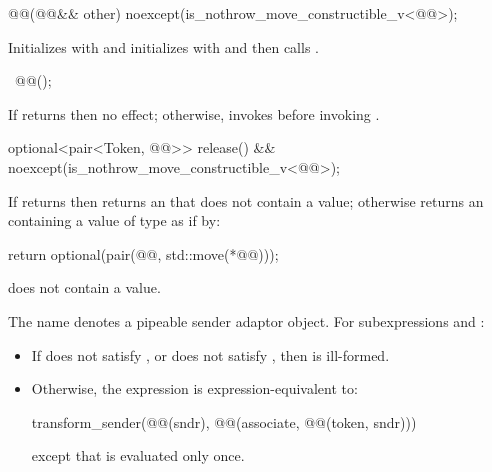 %
\begin{itemdecl}
@@(@@&& other)
  noexcept(is_nothrow_move_constructible_v<@@>);
\end{itemdecl}

\begin{itemdescr}
\pnum
\effects
Initializes  with  and
initializes  with  and
then calls .
\end{itemdescr}

%
\begin{itemdecl}
~@@();
\end{itemdecl}

\begin{itemdescr}
\pnum
\effects
If  returns  then no effect;
otherwise, invokes 
before invoking .
\end{itemdescr}

%
\begin{itemdecl}
optional<pair<Token, @@>>
  release() && noexcept(is_nothrow_move_constructible_v<@@>);
\end{itemdecl}

\begin{itemdescr}
\pnum
\effects
If  returns  then
returns an  that does not contain a value;
otherwise returns an 
containing a value of type 
as if by:
\begin{codeblock}
return optional(pair(@@, std::move(*@@)));
\end{codeblock}

\pnum
\ensures
{} does not contain a value.
\end{itemdescr}

\pnum
The name  denotes a pipeable sender adaptor object.
For subexpressions  and :
\begin{itemize}
\item
If  does not satisfy , or
does not satisfy , then
 is ill-formed.
\item
Otherwise,
the expression 
is expression-equivalent to:
\begin{codeblock}
transform_sender(@@(sndr),
                 @@(associate, @@(token, sndr)))
\end{codeblock}
except that  is evaluated only once.
\end{itemize}

